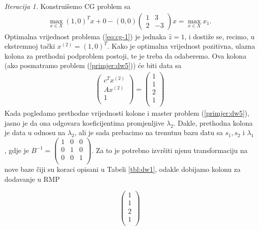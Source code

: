\documentclass[a4paper, utf8, 11pt, colorlinks]{book}
\theoremstyle{definition}
\begin{document}
\emph{Iteracija 1.} 
Konstruišemo CG problem sa
\begin{align}\label{eq:cg-1}
	 \max_{x \in X} (1, 0)^T x + 0 - (0, 0) \left(\begin{array}{cc}
	 	1 & 3 \\
	 	2 & -3
	 \end{array}\right)  x = \max_{x \in X} x_1. 
\end{align} 
Optimalna vrijednost problema (\ref{eq:cg-1}) je jednaka $\hat{z}=1$, i dostiže se, recimo, u ekstremnoj tački $ x^{(2)}= (1, 0)^T.$ Kako je optimalna vrijednost pozitivna, ulazna kolona za prethodni podproblem postoji, te je treba da odaberemo. Ova kolona (ako posmatramo problem (\ref{primjer:dw5})) će biti data sa 
\begin{align}
     \begin{pmatrix}
     	    c^T  x^{(2)} \\
     	    A x^{(2)}  \\
     	    1     \\
     \end{pmatrix} = \begin{pmatrix}
               1 \\
               1  \\
               2  \\
               1\\
 \end{pmatrix}
\end{align}
Kada pogledamo prethodne vrijednosti kolone i master problem (\ref{primjer:dw5}), jasno je da ona odgovara koeficijentima promjenljive $\lambda_2$. Dakle, prethodna kolona je data u odnosu na $\lambda_2$, ali je sada prebacimo na trenutnu bazu datu sa $s_1, s_2$ i $\lambda_1$, gdje je $B^{-1} =  \begin{pmatrix}
	1 & 0 & 0 \\
	0 & 1 & 0  \\
	0 & 0 & 1  \\
\end{pmatrix}. $ %
Za to je potrebno izvršiti njenu transformaciju na nove baze čiji su koraci opisani u Tabeli \ref{tbl:dw1}, odakle dobijamo kolonu za dodavanje u RMP


$$	\begin{pmatrix}
	       1 \\
	      1  \\
	      2  \\
	      1\\
	\end{pmatrix}
 $$
 
\end{document}
